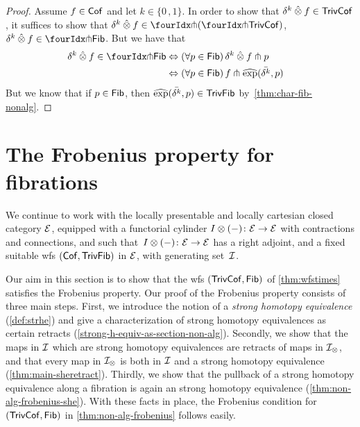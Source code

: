 \documentclass[reqno,10pt,a4paper,oneside,draft]{amsart}
\begin{document}
\begin{proof} Assume $f \in \Cof$ and let $k \in \{0 \,, 1 \}$. In order to show that $\kcyl \hatotimes f \in \TrivCof$, it suffices to show that  $\kcyl \hatotimes f \in \liftl{( \liftr{\TrivCof})}$, \ie $\kcyl \hatotimes f \in \liftl{\Fib}$. But we have that 
\begin{alignat*}{2} 
\kcyl \hatotimes f \in  \liftl{\Fib} 
& \Leftrightarrow (\forall p \in \Fib) \, \kcyl \hatotimes f  \pitchfork p & \\ 
& \Leftrightarrow (\forall p \in \Fib) \, f  \pitchfork \hatexp(\bar{\kcyl}, p) & 
\end{alignat*}
But we know that if $p \in \Fib$, then $ \hatexp(\bar{\kcyl}, p) \in \TrivFib$ by~\cref{thm:char-fib-nonalg}. 
\end{proof} 



\section{The Frobenius property for fibrations}
\label{sec:frob}

We continue to work with the locally presentable and locally cartesian closed category $\catE$, equipped with a functorial cylinder $\interval\otimes (-) \co \catE \to \catE$ with contractions and connections, and such that~$\interval\otimes (-) \co \catE \to \catE$ has a right adjoint, and a fixed suitable wfs $(\Cof, \TrivFib)$ in $\calE$, with generating set~$\cal{I}$.

Our aim in this section is to show that the wfs $(\TrivCof, \Fib)$ of \cref{thm:wfstimes} satisfies the Frobenius property.
Our proof of the Frobenius property consists of three main steps.
First, we introduce the notion of a \emph{strong homotopy equivalence} (\cref{def:strhe}) and give a characterization of strong homotopy equivalences as certain retracts (\cref{strong-h-equiv-as-section-non-alg}).
Secondly, we show that the maps in $\cal{I}$ which are strong homotopy equivalences are retracts of maps in $\cal{I}_\otimes$, and that every map in $\cal{I}_\otimes$ is both in $\cal{I}$ and a strong homotopy
equivalence (\cref{thm:main-sheretract}).
Thirdly, we show that the pullback of a strong homotopy equivalence along a fibration is again an strong homotopy equivalence (\cref{thm:non-alg-frobenius-she}).
With these facts in place, the Frobenius condition for $(\TrivCof, \Fib)$ in \cref{thm:non-alg-frobenius} follows easily.
\end{document}
